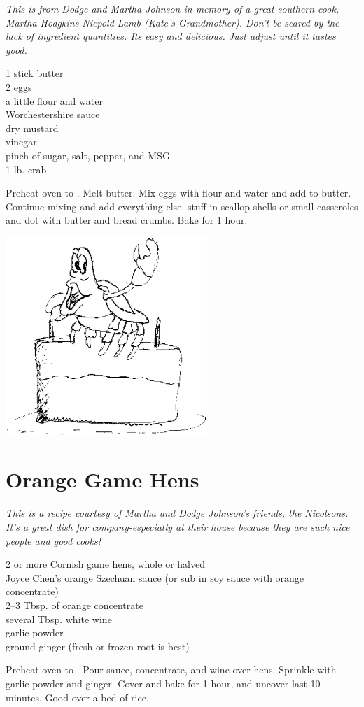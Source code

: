 \textit{This is from Dodge and Martha Johnson in memory of
a great southern cook, Martha Hodgkins Niepold Lamb (Kate's Grandmother).
Don't be scared by the lack of ingredient quantities. Its easy and delicious.
Just adjust until it tastes good.}
\begin{ingredients}
1 stick butter\\
2 eggs\\
a little flour and water\\
Worchestershire sauce\\
dry mustard\\
vinegar\\
pinch of sugar, salt, pepper, and MSG\\
1 lb. crab
\end{ingredients}
Preheat oven to .  Melt butter. Mix eggs with flour and water and add
to butter. Continue mixing and add everything else. stuff in scallop shells or
small casseroles and dot with butter and bread crumbs. Bake for 1 hour.
\begin{center}
    \includegraphics[width=3in,clip]{crab.ps}
\end{center}

\section{Orange Game Hens}

\textit{This is a recipe courtesy of Martha and Dodge Johnson's friends, the
Nicolsons. It's a great dish for company-especially at their house because
they are such nice people and good cooks!}
\begin{ingredients}
2 or more Cornish game hens, whole or halved\\
Joyce Chen's orange Szechuan sauce (or sub in soy sauce with orange 
concentrate)\\
2--3 Tbsp. of orange concentrate\\
several Tbsp. white wine\\
garlic powder\\
ground ginger (fresh or frozen root is best)
\end{ingredients}
Preheat oven to . Pour sauce, concentrate, and wine over hens. Sprinkle
with garlic powder and ginger. Cover and bake for 1 hour, and uncover last 10
minutes. Good over a bed of rice. 

